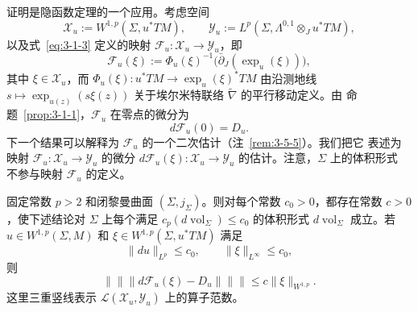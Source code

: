 证明是隐函数定理的一个应用。考虑空间
\[
  \mathcal X_u:=W^{1,p}(\Sigma,u^*TM),
  \qquad
  \mathcal Y_u:=L^p(\Sigma,\Lambda^{0,1}\otimes_Ju^*TM),
\]
以及式~\eqref{eq:3-1-3} 定义的映射
$\mathcal F_u:\mathcal X_u\to\mathcal Y_u$，即
\[
  \mathcal F_u(\xi)
  :=\Phi_u(\xi)^{-1}\bigl(\bar\partial_J(\exp_u(\xi))\bigr),
\]
其中 $\xi\in\mathcal X_u$，而
$\Phi_u(\xi):u^*TM\to\exp_u(\xi)^*TM$ 由沿测地线
$s\mapsto\exp_{u(z)}(s\xi(z))$ 关于埃尔米特联络 $\widetilde\nabla$ 的平行移动定义。由
命题~\ref{prop:3-1-1}，$\mathcal F_u$ 在零点的微分为
\[
  d\mathcal F_u(0)=D_u.
\]
下一个结果可以解释为 $\mathcal F_u$ 的一个二次估计（注~\ref{rem:3-5-5}）。我们把它
表述为映射
$\mathcal F_u:\mathcal X_u\to\mathcal Y_u$
的微分
$d\mathcal F_u(\xi):\mathcal X_u\to\mathcal Y_u$ 的估计。注意，$\Sigma$ 上的体积形式
不参与映射 $\mathcal F_u$ 的定义。

\begin{proposition}\label{prop:3-5-3}
固定常数 $p>2$ 和闭黎曼曲面 $(\Sigma,j_\Sigma)$。则对每个常数 $c_0>0$，都存在常数
$c>0$，使下述结论对 $\Sigma$ 上每个满足
$c_p(d\operatorname{vol}_\Sigma)\le c_0$ 的体积形式
$d\operatorname{vol}_\Sigma$ 成立。若
$u\in W^{1,p}(\Sigma,M)$ 和 $\xi\in W^{1,p}(\Sigma,u^*TM)$ 满足
\begin{equation}\label{eq:3-5-1}
  \lVert du\rVert_{L^p}\le c_0,\qquad
  \lVert\xi\rVert_{L^\infty}\le c_0,
\end{equation}
则
\begin{equation}\label{eq:3-5-2}
  \lVert\!\lVert\!\lVert
  d\mathcal F_u(\xi)-D_u
  \rVert\!\rVert\!\rVert
  \le c\lVert\xi\rVert_{W^{1,p}}.
\end{equation}
这里三重竖线表示 $\mathcal L(\mathcal X_u,\mathcal Y_u)$ 上的算子范数。
\end{proposition}

